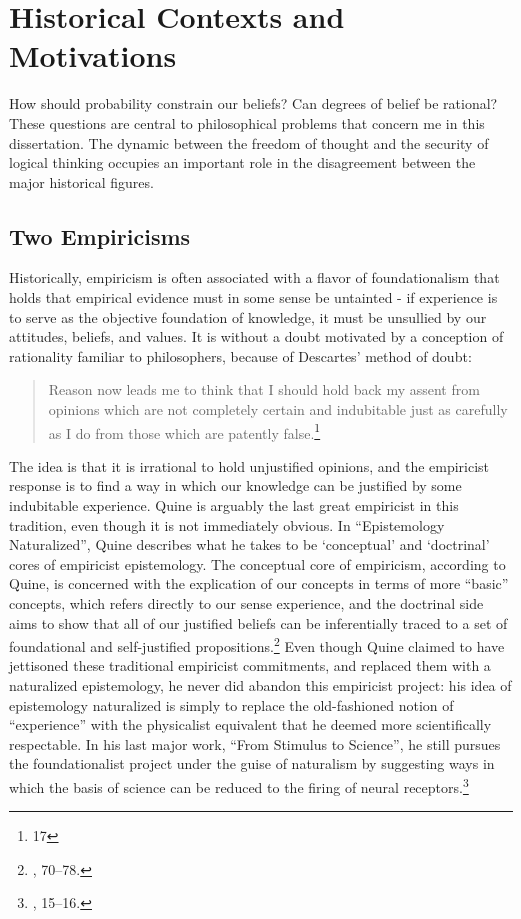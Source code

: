 \hypertarget{historical-context}{%
\section{Historical Contexts and Motivations}\label{historical-context}}

How should probability constrain our beliefs? Can degrees of belief be
rational? These questions are central to philosophical problems that concern me in this dissertation. The dynamic between the freedom of thought and the security of logical thinking occupies an important role in the disagreement between the major historical figures.

\subsection{Two Empiricisms}\label{empiricisms}


Historically, empiricism is often associated with a flavor of
foundationalism that holds that empirical evidence must in some sense be
untainted - if experience is to serve as the objective foundation of
knowledge, it must be unsullied by our attitudes, beliefs, and values.
It is without a doubt motivated by a conception of rationality familiar
to philosophers, because of Descartes' method of doubt:

\begin{quote}
Reason now leads me to think that I should hold back my assent from
opinions which are not completely certain and indubitable just as
carefully as I do from those which are patently false.\footnote{\cite{med} 17}
\end{quote}

The idea is that it is irrational to hold unjustified opinions, and the
empiricist response is to find a way in which our knowledge can be
justified by some indubitable experience. Quine is arguably the last
great empiricist in this tradition, even though it is not immediately
obvious. In ``Epistemology Naturalized'', Quine describes what he takes to
be `conceptual' and `doctrinal' cores of empiricist epistemology. The
conceptual core of empiricism, according to Quine, is concerned with the
explication of our concepts in terms of more ``basic'' concepts, which
refers directly to our sense experience, and the doctrinal side aims to
show that all of our justified beliefs can be inferentially traced to a
set of foundational and self-justified propositions.\footnote{\cite{epistnat}, 70--78.}
Even though Quine claimed to have jettisoned these traditional
empiricist commitments, and replaced them with a naturalized
epistemology, he never did abandon this empiricist project:
his idea of epistemology naturalized is simply to replace the
old-fashioned notion of ``experience'' with the physicalist equivalent that he
deemed more scientifically respectable. In his last major work, ``From
Stimulus to Science'', he still pursues the foundationalist project
under the guise of naturalism by suggesting ways in which the basis
of science can be reduced to the firing of neural receptors.\footnote{\cite{quinefromstim}, 15--16.}

